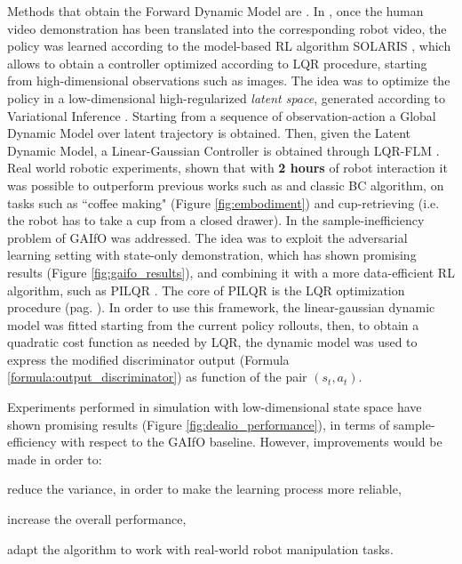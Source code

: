 
\newline Methods that obtain the Forward Dynamic Model are \cite{smith2019avid,torabi2021dealio}. In \cite{smith2019avid}, once the human video demonstration has been translated into the corresponding robot video, the policy was learned according to the model-based RL algorithm SOLARIS \cite{zhang2019solar}, which allows to obtain a controller optimized according to LQR procedure, starting from high-dimensional observations such as images. The idea was to optimize the policy in a low-dimensional high-regularized \textit{latent space}, generated according to Variational Inference \cite{Kingma2014_vae}. Starting from a sequence of observation-action a Global Dynamic Model over latent trajectory is obtained. Then, given the Latent Dynamic Model, a Linear-Gaussian Controller is obtained through LQR-FLM \cite{levine2014lqr_flm}. Real world robotic experiments, shown that with \textbf{2 hours} of robot interaction it was possible to outperform previous works such as \cite{sermanet2018time_contrastive,torabi2018bco} and classic BC algorithm, on tasks such as ``coffee making" (Figure \ref{fig:embodiment}) and cup-retrieving (i.e. the robot has to take a cup from a closed drawer). 
In \cite{torabi2021dealio} the sample-inefficiency problem of GAIfO \cite{torabi2018gaifo} was addressed. The idea was to exploit the adversarial learning setting with state-only demonstration, which has shown promising results (Figure \ref{fig:gaifo_results}), and combining it with a more data-efficient RL algorithm, such as PILQR \cite{chebotar2017pilqr}. The core of PILQR is the LQR optimization procedure (pag. \pageref{lqr}). In order to use this framework, the linear-gaussian dynamic model was fitted starting from the current policy rollouts, then, to obtain a quadratic cost function as needed by LQR, the dynamic model was used to express the modified discriminator output (Formula \ref{formula:output_discriminator}) as function of the pair $(s_{t},a_{t})$.

Experiments performed in simulation with low-dimensional state space have shown promising results (Figure \ref{fig:dealio_performance}), in terms of sample-efficiency with respect to the GAIfO baseline. However, improvements would be made in order to: \begin{enumerate*}[label=\textbf{(\arabic*)}]
    \item reduce the variance, in order to make the learning process more reliable,
    \item increase the overall performance,
    \item adapt the algorithm to work with real-world robot manipulation tasks.
\end{enumerate*}
